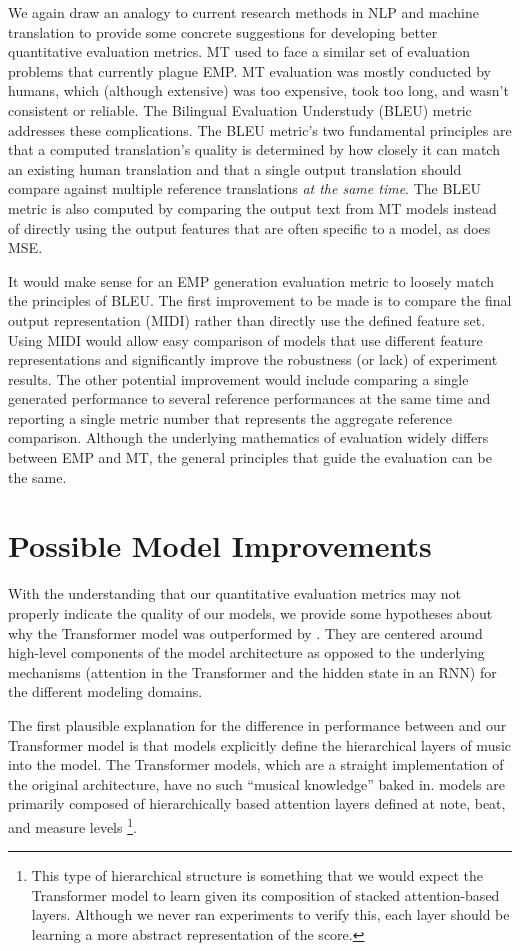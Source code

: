 We again draw an analogy to current research methods in NLP and machine translation to provide some concrete suggestions for developing better quantitative evaluation metrics. MT used to face a similar set of evaluation problems that currently plague EMP. MT evaluation was mostly conducted by humans, which (although extensive) was too expensive, took too long, and wasn't consistent or reliable. The Bilingual Evaluation Understudy (BLEU) metric~\cite{papineni2002bleu} addresses these complications. The BLEU metric's two fundamental principles are that a computed translation's quality is determined by how closely it can match an existing human translation and that a single output translation should compare against multiple reference translations \emph{at the same time}. The BLEU metric is also computed by comparing the output text from MT models instead of directly using the output features that are often specific to a model, as does MSE. 

It would make sense for an EMP generation evaluation metric to loosely match the principles of BLEU. The first improvement to be made is to compare the final output representation (MIDI) rather than directly use the defined feature set. Using MIDI would allow easy comparison of models that use different feature representations and significantly improve the robustness (or lack) of experiment results. The other potential improvement would include comparing a single generated performance to several reference performances at the same time and reporting a single metric number that represents the aggregate reference comparison. Although the underlying mathematics of evaluation widely differs between EMP and MT, the general principles that guide the evaluation can be the same. 

\section{Possible Model Improvements}
With the understanding that our quantitative evaluation metrics may not properly indicate the quality of our models, we provide some hypotheses about why the Transformer model was outperformed by \vnet{}. They are centered around high-level components of the model architecture as opposed to the underlying mechanisms (attention in the Transformer and the hidden state in an RNN) for the different modeling domains. 

The first plausible explanation for the difference in performance between \vnet{} and our Transformer model is that \vnet{} models explicitly define the hierarchical layers of music into the model. The Transformer models, which are a straight implementation of the original architecture, have no such ``musical knowledge'' baked in. \vnet{} models are primarily composed of hierarchically based attention layers defined at note, beat, and measure levels%
\footnote{This type of hierarchical structure is something that we would expect the Transformer model to learn given its composition of stacked attention-based layers. Although we never ran experiments to verify this, each layer should be learning a more abstract representation of the score.}. 

